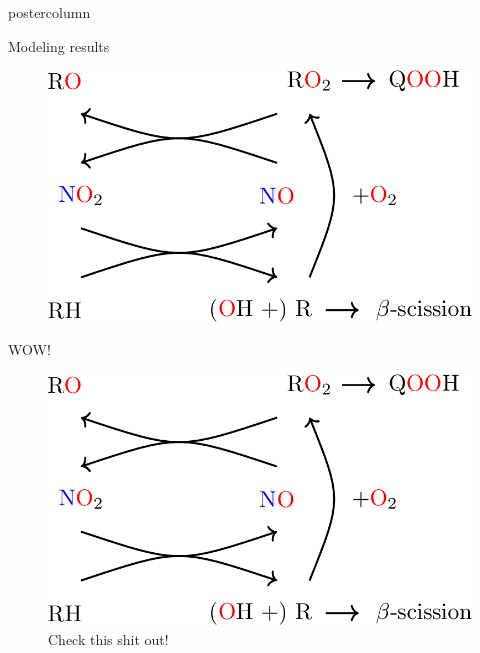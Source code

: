 \documentclass[final,hyperref={pdfpagelabels=false}]{beamer}
\begin{document}
\begin{frame}
\begin{columns}
	\begin{column}{.98\textwidth}
		\begin{beamercolorbox}[center,wd=\textwidth]{postercolumn}
			\begin{block}{\LARGE Modeling results}
				\begin{multicols}{2}
					\begin{figure}
						\centering
						\includegraphics[width=0.8\linewidth]{../figures/NOx_cycle.png}
					\end{figure}
					\centering
					WOW!
					\columnbreak
					\begin{figure}
						\centering
						\includegraphics[width=0.8\linewidth]{../figures/NOx_cycle.png}
						\caption{Check this shit out!}
					\end{figure}
				\end{multicols}
			\end{block}
		\end{beamercolorbox}
	

\end{column}
\end{columns}
\end{frame}
\end{document}
